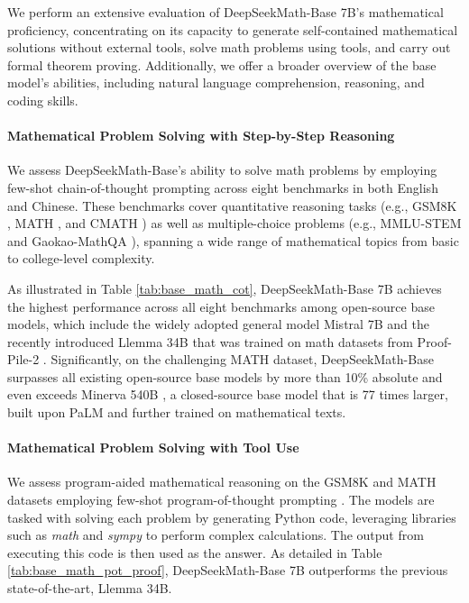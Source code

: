 We perform an extensive evaluation of DeepSeekMath-Base 7B’s mathematical proficiency, concentrating on its capacity to generate self-contained mathematical solutions without external tools, solve math problems using tools, and carry out formal theorem proving. Additionally, we offer a broader overview of the base model’s abilities, including natural language comprehension, reasoning, and coding skills.

\paragraph{Mathematical Problem Solving with Step-by-Step Reasoning}

We assess DeepSeekMath-Base’s ability to solve math problems by employing few-shot chain-of-thought prompting \citep{cot} across eight benchmarks in both English and Chinese. These benchmarks cover quantitative reasoning tasks (e.g., GSM8K \citep{gsm8k}, MATH \citep{MATH}, and CMATH \citep{wei2023cmath}) as well as multiple-choice problems (e.g., MMLU-STEM \citep{mmlu} and Gaokao-MathQA \citep{agieval}), spanning a wide range of mathematical topics from basic to college-level complexity.

As illustrated in Table \ref{tab:base_math_cot}, DeepSeekMath-Base 7B achieves the highest performance across all eight benchmarks among open-source base models, which include the widely adopted general model Mistral 7B \citep{mistral} and the recently introduced Llemma 34B \citep{llemma} that was trained on math datasets from Proof-Pile-2 \citep{llemma}. Significantly, on the challenging MATH dataset, DeepSeekMath-Base surpasses all existing open-source base models by more than 10\% absolute and even exceeds Minerva 540B \citep{minerva}, a closed-source base model that is 77 times larger, built upon PaLM \citep{palm} and further trained on mathematical texts.

\paragraph{Mathematical Problem Solving with Tool Use} We assess program-aided mathematical reasoning on the GSM8K and MATH datasets employing few-shot program-of-thought prompting \citep{pot,pal}. The models are tasked with solving each problem by generating Python code, leveraging libraries such as \textit{math} and \textit{sympy} to perform complex calculations. The output from executing this code is then used as the answer. As detailed in Table \ref{tab:base_math_pot_proof}, DeepSeekMath-Base 7B outperforms the previous state-of-the-art, Llemma 34B.

